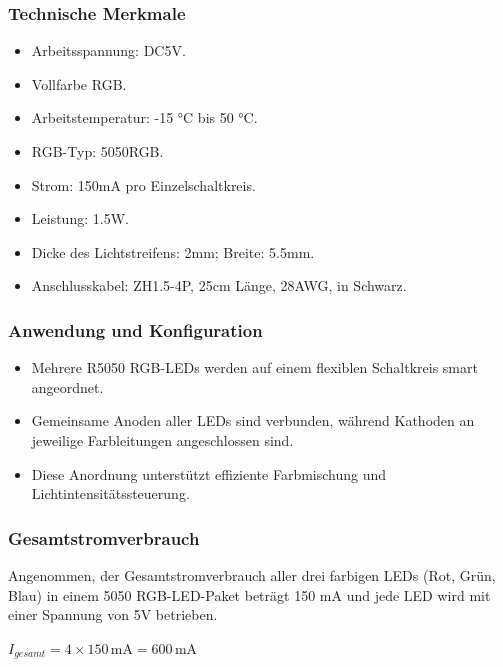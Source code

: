 \documentclass{vorlage-design-main}
\begin{document}
\hypertarget{technische-merkmale}{%
\subsubsection{Technische Merkmale}\label{technische-merkmale}}

\begin{itemize}

\item
  Arbeitsspannung: DC5V.
\item
  Vollfarbe RGB.
\item
  Arbeitstemperatur: -15 °C bis 50 °C.
\item
  RGB-Typ: 5050RGB.
\item
  Strom: 150mA pro Einzelschaltkreis.
\item
  Leistung: 1.5W.
\item
  Dicke des Lichtstreifens: 2mm; Breite: 5.5mm.
\item
  Anschlusskabel: ZH1.5-4P, 25cm Länge, 28AWG, in Schwarz.
\end{itemize}

\hypertarget{anwendung-und-konfiguration}{%
\subsubsection{Anwendung und
Konfiguration}\label{anwendung-und-konfiguration}}

\begin{itemize}

\item
  Mehrere R5050 RGB-LEDs werden auf einem flexiblen Schaltkreis smart
  angeordnet.
\item
  Gemeinsame Anoden aller LEDs sind verbunden, während Kathoden an
  jeweilige Farbleitungen angeschlossen sind.
\item
  Diese Anordnung unterstützt effiziente Farbmischung und
  Lichtintensitätssteuerung.
\end{itemize}

\hypertarget{gesamtstromverbrauch}{%
\subsubsection{Gesamtstromverbrauch}\label{gesamtstromverbrauch}}

Angenommen, der Gesamtstromverbrauch aller drei farbigen LEDs (Rot,
Grün, Blau) in einem 5050 RGB-LED-Paket beträgt 150 mA und jede LED wird
mit einer Spannung von 5V betrieben.

$I_{gesamt} = 4 \times 150\, \text{mA} = 600\, \text{mA}$
\end{document}
